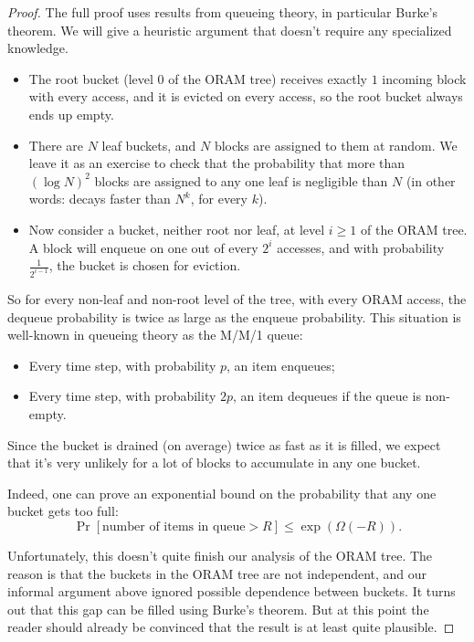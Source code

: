 \begin{proof}
The full proof uses results from queueing theory,
in particular \alert{Burke's theorem}.
We will give a heuristic argument that doesn't require any specialized
knowledge.

\begin{itemize}
\item
  The root bucket (level $0$ of the ORAM tree) receives exactly $1$
  incoming block with every access, and it is evicted on every access,
  so the root bucket always ends up empty.
\item
  There are $N$ leaf buckets, and $N$ blocks are assigned to them at
  random. We leave it as an exercise to check that the probability that
  more than $( \log N )^{2}$ blocks are assigned to any one
  leaf is negligible than $N$ (in other words: decays faster than
  $N^{k}$, for every $k$).
\item
  Now consider a bucket, neither root nor leaf, at level $i \geq 1$ of
  the ORAM tree. A block will enqueue on one out of every $2^{i}$
  accesses, and with probability $\frac{1}{2^{i - 1}}$, the bucket is
  chosen for eviction.
\end{itemize}

So for every non-leaf and non-root level of the tree, with every ORAM
access, the dequeue probability is twice as large as the enqueue
probability. This situation is well-known in queueing theory as the
\alert{M/M/1 queue}:

\begin{itemize}
\item
  Every time step, with probability $p$, an item enqueues;
\item
  Every time step, with probability $2p$, an item dequeues if the
  queue is non-empty.
\end{itemize}

Since the bucket is drained (on average) twice as fast as it is filled,
we expect that it's very unlikely for a lot of blocks to accumulate in
any one bucket.

Indeed, one can prove an exponential bound on the probability that any
one bucket gets too full:
\[\Pr [\mathrm{\text{number of items in queue}} > R] \leq \exp( \Omega( - R) ).\]

Unfortunately, this doesn't quite finish our analysis of the ORAM tree.
The reason is that the buckets in the ORAM tree are not independent, and
our informal argument above ignored possible dependence between buckets.
It turns out that this gap can be filled using Burke's theorem. But at
this point the reader should already be convinced that the result is at
least quite plausible.
\end{proof}

